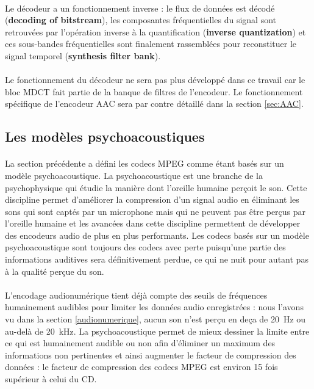 \documentclass{article}
\begin{document}
    \paragraph{}
    Le décodeur a un fonctionnement inverse : le flux de données est décodé (\textbf{decoding of bitstream}), les composantes fréquentielles du signal sont retrouvées par l'opération inverse à la quantification (\textbf{inverse quantization}) et ces sous-bandes fréquentielles sont finalement rassemblées pour reconstituer le signal temporel (\textbf{synthesis filter bank}).

    \paragraph{}
    Le fonctionnement du décodeur ne sera pas plus développé dans ce travail car le bloc MDCT fait partie de la banque de filtres de l'encodeur. Le fonctionnement spécifique de l'encodeur AAC sera par contre détaillé dans la section \ref{sec:AAC}.


    \subsection{Les modèles psychoacoustiques}
    \paragraph{}
    La section précédente a défini les codecs MPEG comme étant basés sur un modèle psychoacoustique. La psychoacoustique est une branche de la psychophysique qui étudie la manière dont l'oreille humaine perçoit le son\cite{wiki:psychoacoustic}. Cette discipline permet d'améliorer la compression d'un signal audio en éliminant les sons qui sont captés par un microphone mais qui ne peuvent pas être perçus par l'oreille humaine et les avancées dans cette discipline permettent de développer des encodeurs audio de plus en plus performants. Les codecs basés sur un modèle psychoacoustique sont toujours des codecs avec perte puisqu'une partie des informations auditives sera définitivement perdue, ce qui ne nuit pour autant pas à la qualité perçue du son.

    \paragraph{}
    L'encodage audionumérique tient déjà compte des seuils de fréquences humainement audibles pour limiter les données audio enregistrées : nous l'avons vu dans la section \ref{audionumerique}, aucun son n'est perçu en deça de \SI{20}{\hertz} ou au-delà de \SI{20}{\kilo\hertz}. La psychoacoustique permet de mieux dessiner la limite entre ce qui est humainement audible ou non afin d'éliminer un maximum des informations non pertinentes et ainsi augmenter le facteur de compression des données : le facteur de compression des codecs MPEG est environ 15 fois supérieur à celui du CD\cite{2019-Herre-Dick}.
\end{document}
